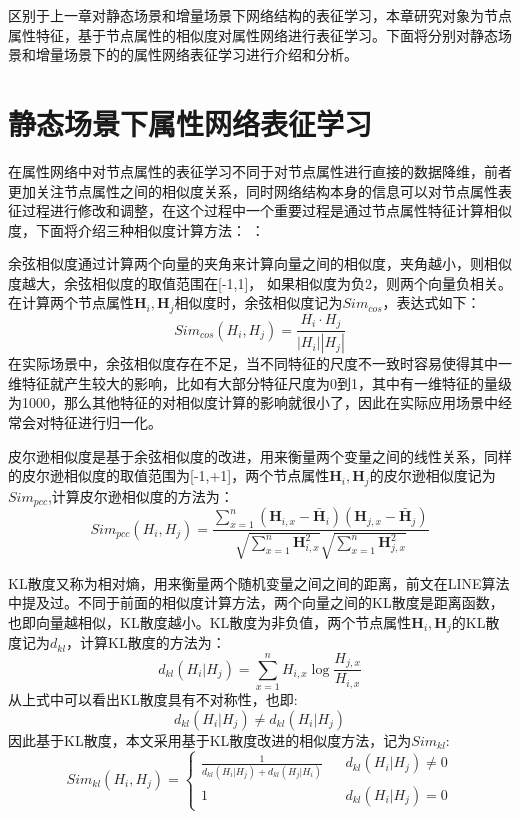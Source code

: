 区别于上一章对静态场景和增量场景下网络结构的表征学习，本章研究对象为节点属性特征，基于节点属性的相似度对属性网络进行表征学习。下面将分别对静态场景和增量场景下的的属性网络表征学习进行介绍和分析。

\section{静态场景下属性网络表征学习}
在属性网络中对节点属性的表征学习不同于对节点属性进行直接的数据降维，前者更加关注节点属性之间的相似度关系，同时网络结构本身的信息可以对节点属性表征过程进行修改和调整，在这个过程中一个重要过程是通过节点属性特征计算相似度，下面将介绍三种相似度计算方法：
：

 余弦相似度通过计算两个向量的夹角来计算向量之间的相似度，夹角越小，则相似度越大，余弦相似度的取值范围在[-1,1]， 如果相似度为负2，则两个向量负相关。在计算两个节点属性$\textbf{H}_i, \textbf{H}_j$相似度时，余弦相似度记为$Sim_{cos}$，表达式如下：
\begin{equation}
	Sim_{cos}(H_i, H_j) = \frac{H_i \cdot H_j}{|H_i||H_j|}
\end{equation}
在实际场景中，余弦相似度存在不足，当不同特征的尺度不一致时容易使得其中一维特征就产生较大的影响，比如有大部分特征尺度为0到1，其中有一维特征的量级为1000，那么其他特征的对相似度计算的影响就很小了，因此在实际应用场景中经常会对特征进行归一化。


皮尔逊相似度是基于余弦相似度的改进，用来衡量两个变量之间的线性关系，同样的皮尔逊相似度的取值范围为[-1,+1]，两个节点属性$\textbf{H}_i, \textbf{H}_j$的皮尔逊相似度记为$Sim_{pcc}$,计算皮尔逊相似度的方法为：
\begin{equation}
	Sim_{pcc}(H_i, H_j) = \frac{\sum_{x=1}^n(\textbf{H}_{i,x}-\bar{\textbf{H}}_i)(\textbf{H}_{j,x}-\bar{\textbf{H}}_j)}
	{\sqrt{\sum_{x=1}^n \textbf{H}_{i,x} ^2 }\sqrt{\sum_{x=1}^n \textbf{H}_{j,x} ^2 }}
\end{equation}



KL散度又称为相对熵，用来衡量两个随机变量之间之间的距离，前文在LINE算法中提及过。不同于前面的相似度计算方法，两个向量之间的KL散度是距离函数，也即向量越相似，KL散度越小。KL散度为非负值，两个节点属性$\textbf{H}_i, \textbf{H}_j$的KL散度记为$d_{kl}$，计算KL散度的方法为：
\begin{equation}
	d_{kl}(H_i|H_j) = \sum_{x=1}^n H_{i,x}\log{\frac{H_{j,x}}{H_{i,x}}} 
\end{equation}
从上式中可以看出KL散度具有不对称性，也即:
\begin{equation}
d_{kl}(H_i|H_j) \ne d_{kl}(H_i|H_j)
\end{equation}
因此基于KL散度，本文采用基于KL散度改进的相似度方法，记为$Sim_{kl}$:
\begin{equation}
Sim_{kl}(H_i, H_j)=\left\{
\begin{array}{ccl}
\frac{1}{d_{kl}(H_i|H_j)+d_{kl}(H_j|H_i)}       &      & d_{kl}(H_i|H_j)\ne 0\\
1     &      & d_{kl}(H_i|H_j)=0
\end{array} \right.
\end{equation}

